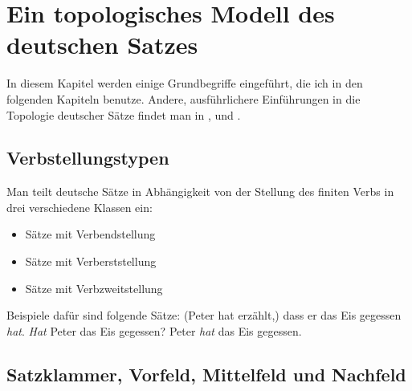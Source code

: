 

\chapter{Ein topologisches Modell des deutschen Satzes}
\label{topo}

%
In diesem Kapitel werden einige Grundbegriffe eingeführt, die ich in den folgenden
Kapiteln benutze. 
Andere, ausführlichere Einführungen in die Topologie deutscher Sätze
findet man in ,  und .

\section{Verbstellungstypen}

Man teilt deutsche Sätze in Abhängigkeit von der Stellung des finiten Verbs 
in drei verschiedene Klassen ein:
\begin{itemize}
\item Sätze mit Verbendstellung
\item Sätze mit Verberststellung
\item Sätze mit Verbzweitstellung
\end{itemize}
Beispiele dafür sind folgende Sätze:
\eal
\ex (Peter hat erzählt,) dass er das Eis gegessen \emph{hat}.
\ex \emph{Hat} Peter das Eis gegessen?
\ex Peter \emph{hat} das Eis gegessen.
\zl

% 
%



\section{Satzklammer, Vorfeld, Mittelfeld und Nachfeld}

